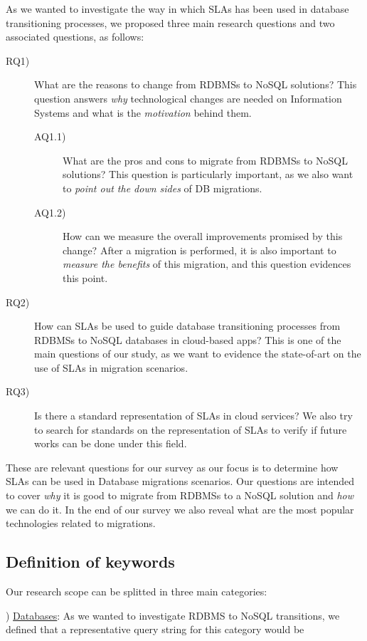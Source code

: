 \documentclass{article}
\begin{document}
As we wanted to investigate the way in which SLAs has been used in database transitioning processes, we proposed three main research questions and two associated questions, as follows:
\begin{description}
\item[RQ1)] What are the reasons to change from RDBMSs to NoSQL solutions? This question answers \textit{why} technological changes are needed on Information Systems and what is the \textit{motivation} behind them. 
  \begin{description}
  \item[AQ1.1)] What are the pros and cons to migrate from RDBMSs to NoSQL solutions? This question is particularly important, as we also want to \textit{point out the down sides} of DB migrations. 
  \item[AQ1.2)] How can we measure the overall improvements promised by this change? After a migration is performed, it is also important to \textit{measure the benefits} of this migration, and this question evidences this point. 
  \end{description}
\item[RQ2)] How can SLAs be used to guide database transitioning processes from RDBMSs to NoSQL databases in cloud-based apps? This is one of the main questions of our study, as we want to evidence the state-of-art on the use of SLAs in migration scenarios. 
\item[RQ3)] Is there a standard representation of SLAs in cloud services? We also try to search for standards on the representation of SLAs to verify if future works can be done under this field.
\end{description}

These are relevant questions for our survey as our focus is to determine how SLAs can be used in Database migrations scenarios. 
Our questions are intended to cover \textit{why} it is good to migrate from RDBMSs to a NoSQL solution and \textit{how} we can do it. In the end of our survey we also reveal what are the most popular technologies related to migrations.

\subsection{Definition of keywords}
\label{sec:sok}

Our research scope can be splitted in three main categories: 

) \underline{Databases}: As we wanted to investigate RDBMS to NoSQL transitions, we defined that a representative query string for this category would be 
\end{document}
